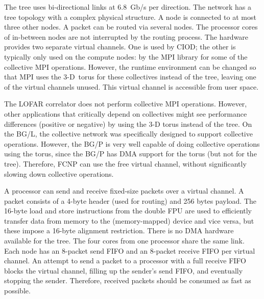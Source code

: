 \documentclass[conference]{worldcomp}
\begin{document}
The tree uses bi-directional links at 6.8~Gb/s per direction.
The network has a tree topology with a complex physical structure.
A node is connected to at most three other nodes.
A packet can be routed via several nodes.
The processor cores of in-between nodes are not interrupted by the routing
process.
The hardware provides two separate virtual channels.
One is used by CIOD;
the other is typically only used on the compute nodes: by the MPI library for
some of the collective MPI operations.
However, the runtime environment can be changed so that MPI uses the
3-D~torus for these collectives instead of the tree, leaving one of the virtual
channels unused.
This virtual channel is accessible from user space.

The LOFAR correlator does not perform collective MPI operations.
However, other applications that critically depend on collectives might
see performance differences (positive or negative) by using the 3-D torus
instead of the tree.
On the BG/L, the collective network was specifically designed to
support collective operations.
However, the BG/P is very well capable of doing collective operations
using the torus, since the BG/P has DMA support for the torus
(but not for the tree).
Therefore, FCNP can use the free virtual channel, without significantly
slowing down collective operations.

A processor can send and receive fixed-size packets over a virtual channel.
A packet consists of a 4-byte header (used for routing) and 256 bytes payload.
The 16-byte load and store instructions from the double FPU are used to
efficiently transfer data from memory to the (memory-mapped) device and vice
versa, but these impose a 16-byte alignment restriction.
There is no DMA hardware available for the tree.
The four cores from one processor share the same link.
Each node has an 8-packet send FIFO and an 8-packet receive FIFO per virtual
channel.
An attempt to send a packet to a processor with a full receive FIFO blocks
the virtual channel, filling up the sender's send FIFO, and eventually stopping
the sender.
Therefore, received packets should be consumed as fast as possible.

\end{document}
